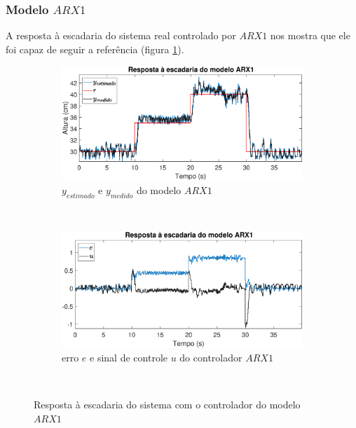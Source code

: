 \subsubsection{Modelo $ARX1$}
A resposta à escadaria do sistema real controlado por $ARX1$ nos mostra que ele foi capaz de seguir a referência (figura \ref{fig:stairrarx1y}).

\begin{figure}[htb]
	\centering
	\begin{subfigure}[t]{0.48\textwidth}
		\includegraphics[width=1\linewidth]{stairrarx1y}
		\caption[$y_{estimado}$ e $y_{medido}$ do modelo $ARX1$]{$y_{estimado}$ e $y_{medido}$ do modelo $ARX1$}
		\label{fig:stairrarx1y}
	\end{subfigure}
	~ %
	\begin{subfigure}[t]{0.48\textwidth}
		\includegraphics[width=1\linewidth]{stairrarx1e}
		\caption[erro $e$ e sinal de controle $u$ do controlador $ARX1$]{erro $e$ e sinal de controle $u$ do controlador $ARX1$}
		\label{fig:stairrarx1e}
	\end{subfigure}
	~ %
	
	\caption{Resposta à escadaria do sistema com o controlador do modelo $ARX1$}\label{fig:stairrarx1}
\end{figure}

